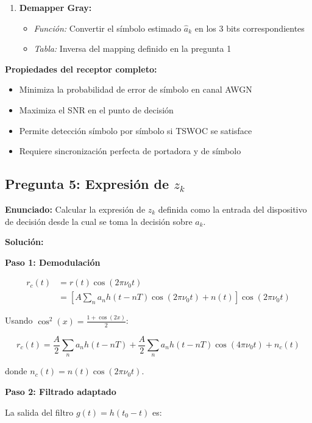\documentclass[11pt,a4paper]{article}
\begin{document}
\begin{enumerate}
    \item \textbf{Demapper Gray:}
    \begin{itemize}
        \item \textit{Funci\'on:} Convertir el s\'imbolo estimado $\hat{a}_k$ en los 3 bits correspondientes
        \item \textit{Tabla:} Inversa del mapping definido en la pregunta 1
    \end{itemize}
\end{enumerate}

\textbf{Propiedades del receptor completo:}
\begin{itemize}
    \item Minimiza la probabilidad de error de s\'imbolo en canal AWGN
    \item Maximiza el SNR en el punto de decisi\'on
    \item Permite detecci\'on s\'imbolo por s\'imbolo si TSWOC se satisface
    \item Requiere sincronizaci\'on perfecta de portadora y de s\'imbolo
\end{itemize}



\subsection*{Pregunta 5: Expresi\'on de $z_k$}

\textbf{Enunciado:} Calcular la expresi\'on de $z_k$ definida como la entrada del dispositivo de decisi\'on desde la cual se toma la decisi\'on sobre $a_k$.

\vspace{0.3cm}
\textbf{Soluci\'on:}

\textbf{Paso 1: Demodulaci\'on}

\begin{align*}
r_c(t) &= r(t)\cos(2\pi\nu_0 t) \\
&= \left[A\sum_n a_n h(t-nT)\cos(2\pi\nu_0 t) + n(t)\right]\cos(2\pi\nu_0 t)
\end{align*}

Usando $\cos^2(x) = \frac{1 + \cos(2x)}{2}$:

\[
r_c(t) = \frac{A}{2}\sum_n a_n h(t-nT) + \frac{A}{2}\sum_n a_n h(t-nT)\cos(4\pi\nu_0 t) + n_c(t)
\]

donde $n_c(t) = n(t)\cos(2\pi\nu_0 t)$.

\textbf{Paso 2: Filtrado adaptado}

La salida del filtro $g(t) = h(t_0 - t)$ es:
\end{document}
